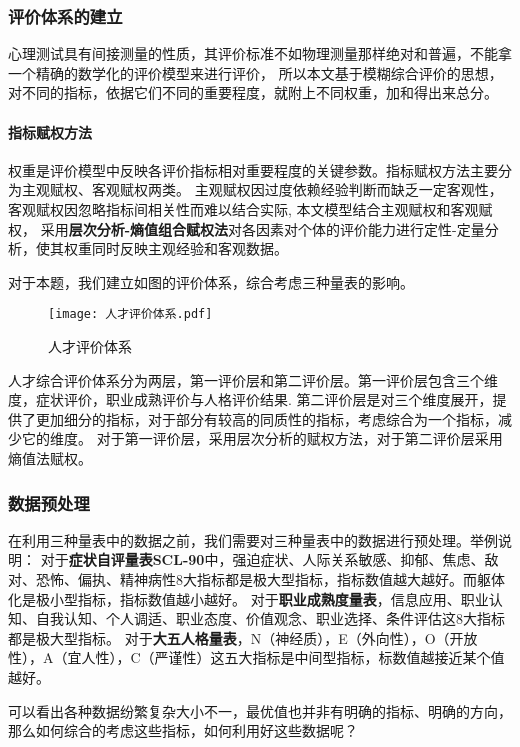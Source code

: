 \documentclass[withoutpreface,bwprint]{cumcmthesis} %
\begin{document}
\subsubsection{评价体系的建立}


心理测试具有间接测量的性质，其评价标准不如物理测量那样绝对和普遍，不能拿一个精确的数学化的评价模型来进行评价，
所以本文基于模糊综合评价的思想，对不同的指标，依据它们不同的重要程度，就附上不同权重，加和得出来总分。

\paragraph*{指标赋权方法}权重是评价模型中反映各评价指标相对重要程度的关键参数。指标赋权方法主要分为主观赋权、客观赋权两类。
主观赋权因过度依赖经验判断而缺乏一定客观性，客观赋权因忽略指标间相关性而难以结合实际, 本文模型结合主观赋权和客观赋权，
采用\textbf{层次分析-熵值组合赋权法}对各因素对个体的评价能力进行定性-定量分析，使其权重同时反映主观经验和客观数据。

对于本题，我们建立如图的评价体系，综合考虑三种量表的影响。

\begin{figure}[!h]
    \centering
    \texttt{[image: 人才评价体系.pdf]}
    \caption{人才评价体系}
    \label{fig:judgement}
\end{figure}

人才综合评价体系分为两层，第一评价层和第二评价层。第一评价层包含三个维度，症状评价，职业成熟评价与人格评价结果.
第二评价层是对三个维度展开，提供了更加细分的指标，对于部分有较高的同质性的指标，考虑综合为一个指标，减少它的维度。
对于第一评价层，采用层次分析的赋权方法，对于第二评价层采用熵值法赋权。


\subsubsection{数据预处理}
在利用三种量表中的数据之前，我们需要对三种量表中的数据进行预处理。举例说明：
对于\textbf{症状自评量表SCL-90}中，强迫症状、人际关系敏感、抑郁、焦虑、敌对、恐怖、偏执、精神病性8大指标都是极大型指标，指标数值越大越好。而躯体化是极小型指标，指标数值越小越好。
对于\textbf{职业成熟度量表}，信息应用、职业认知、自我认知、个人调适、职业态度、价值观念、职业选择、条件评估这8大指标都是极大型指标。
对于\textbf{大五人格量表}，N（神经质），E（外向性），O（开放性），A（宜人性），C（严谨性）这五大指标是中间型指标，标数值越接近某个值越好。

可以看出各种数据纷繁复杂大小不一，最优值也并非有明确的指标、明确的方向，那么如何综合的考虑这些指标，如何利用好这些数据呢？
\end{document}
